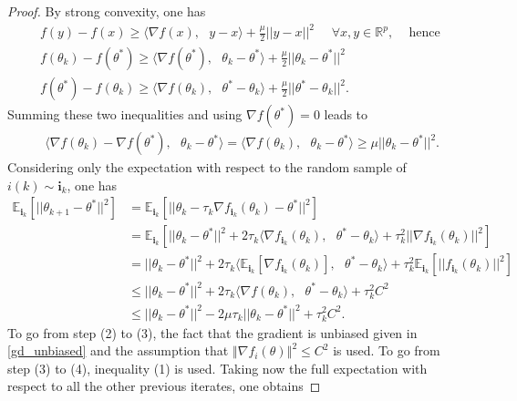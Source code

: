\begin{proof} By strong convexity, one has
\begin{align}
    &f(y) - f(x) \geq \langle \nabla f(x),\text{ } y-x\rangle + \frac{\mu}{2}||y-x||^{2} \text{ }\text{ } \forall x,y \in \mathbb{R}^{p} \text{,} \text{ } \text{ } \text{hence } \nonumber\\
    &f(\theta_{k}) - f(\theta^{*}) \geq \langle \nabla f(\theta^{*}),\text{ } \theta_{k}-\theta^{*}\rangle + \frac{\mu}{2}||\theta_{k}-\theta^{*}||^{2}\nonumber\\
    &f(\theta^{*}) - f(\theta_{k}) \geq \langle \nabla f(\theta_{k}),\text{ } \theta^{*}-\theta_{k}\rangle + \frac{\mu}{2}||\theta^{*}-\theta_{k}||^{2}.\nonumber
\end{align}
Summing these two inequalities and using $\nabla f(\theta^{*}) = 0$ leads to
\setcounter{equation}{0}
\begin{align}
    &\langle \nabla f(\theta_{k}) - \nabla f(\theta^{*}),\text{ } \theta_{k} - \theta^{*}\rangle = \langle \nabla f(\theta_{k}),\text{ } \theta_{k} - \theta^{*}\rangle \geq \mu ||\theta_{k} - \theta^{*}||^{2}.
\end{align}
Considering only the expectation with respect to the random sample of $i(k) \sim \textbf{i}_{k}$, one has
\begin{align}
\mathbb{E}_{\textbf{i}_{k}}[||\theta_{k+1}-\theta^{*}||^{2}]
    &= \mathbb{E}_{\textbf{i}_{k}}[||\theta_{k} - \tau_{k}\nabla f_{\textbf{i}_{k}}(\theta_{k}) - \theta^{*}||^{2}]\nonumber\\
    &= \mathbb{E}_{\textbf{i}_{k}}[||\theta_{k}-\theta^{*}||^{2} + 2\tau_{k}\langle\nabla f_{\textbf{i}_{k}}(\theta_{k}),\text{ } \theta^{*} - \theta_{k}\rangle + \tau_{k}^{2}||\nabla f_{\textbf{i}_{k}}(\theta_{k})||^{2}]\nonumber\\
    &= ||\theta_{k}-\theta^{*}||^{2} + 2\tau_{k}\langle \mathbb{E}_{\textbf{i}_{k}}[\nabla f_{\textbf{i}_{k}}(\theta_{k})], \text{ } \theta^{*} - \theta_{k}\rangle + \tau_{k}^{2} \mathbb{E}_{\textbf{i}_{k}}[||f_{\textbf{i}_{k}}(\theta_{k})||^{2}]\\
    &\leq ||\theta_{k}-\theta^{*}||^{2} + 2\tau_{k}\langle \nabla f(\theta_{k}), \text{ } \theta^{*} - \theta_{k}\rangle + \tau_{k}^{2} C^{2}\\
    &\leq ||\theta_{k}-\theta^{*}||^{2} - 2\mu \tau_{k} ||\theta_{k}-\theta^{*}||^{2} + \tau_{k}^{2} C^{2}.
\end{align}
To go from step (2) to (3), the fact that the gradient is unbiased given in \eqref{gd_unbiased} and the assumption that $\left\Vert\nabla f_{i}(\theta)\right\Vert^{2} \leq C^{2}$ is used. To go from step (3) to (4), inequality (1) is used. Taking now the full expectation with respect to all the other previous iterates, one obtains

\end{proof}
